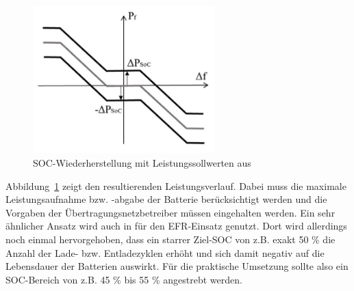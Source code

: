\begin{figure}[h!]
    \centering
    \includegraphics[width=7cm]{Abbildungen/DroopErweitert.png}
    \caption{SOC-Wiederherstellung mit Leistungssollwerten aus \parencite[]{noauthor_soc_nodate}}\label{Droopplus}
\end{figure}

Abbildung~\ref{Droopplus} zeigt den resultierenden Leistungsverlauf.
Dabei muss die maximale Leistungsaufnahme bzw. -abgabe der Batterie berücksichtigt werden und die Vorgaben der
Übertragungsnetzbetreiber müssen eingehalten werden.
Ein sehr ähnlicher Ansatz wird auch in \parencite[]{mantar_gundogdu_battery_2018} für den EFR-Einsatz genutzt.
Dort wird allerdings noch einmal hervorgehoben, dass ein starrer Ziel-SOC von z.B. exakt 50 \% die 
Anzahl der Lade- bzw. Entladezyklen erhöht und sich damit negativ auf die Lebensdauer der Batterien auswirkt.
Für die praktische Umsetzung sollte also ein SOC-Bereich von z.B. 45 \% bis 55 \% angestrebt werden.
